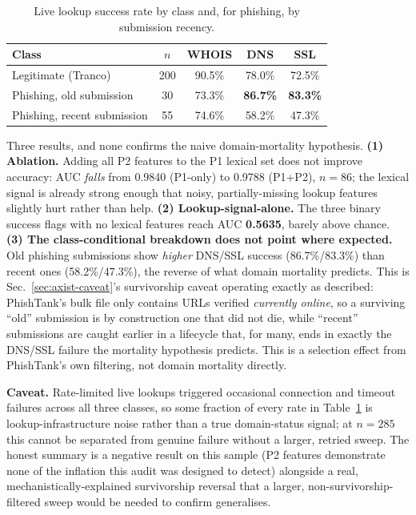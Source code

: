 \documentclass[conference]{IEEEtran}
\begin{document}
\begin{table}[t]
\caption{Live lookup success rate by class and, for phishing, by
submission recency.}
\label{tab:provenance}
\centering\footnotesize
\begin{tabular}{@{}lcccc@{}}
\toprule
\textbf{Class} & \textbf{$n$} & \textbf{WHOIS} & \textbf{DNS} & \textbf{SSL}\\
\midrule
Legitimate (Tranco) & 200 & 90.5\% & 78.0\% & 72.5\%\\
Phishing, old submission & 30 & 73.3\% & \textbf{86.7\%} & \textbf{83.3\%}\\
Phishing, recent submission & 55 & 74.6\% & 58.2\% & 47.3\%\\
\bottomrule
\end{tabular}
\end{table}

Three results, and none confirms the naive domain-mortality hypothesis.
\textbf{(1) Ablation.} Adding all P2 features to the P1 lexical set does not improve accuracy: AUC \emph{falls} from 0.9840 (P1-only) to
0.9788
(P1+P2), $n=86$; the lexical signal is already strong enough that noisy,
partially-missing lookup features slightly hurt rather than help.
\textbf{(2) Lookup-signal-alone.} The three binary success flags with no
lexical features reach AUC \textbf{0.5635}, barely above chance.
\textbf{(3) The class-conditional breakdown does not point where
expected.} Old phishing submissions show \emph{higher} DNS/SSL success
(86.7\%/83.3\%) than recent ones (58.2\%/47.3\%), the reverse of what domain mortality
predicts. This is Sec.~\ref{sec:axist-caveat}'s
survivorship caveat operating exactly as described: PhishTank's bulk file
only contains URLs verified \emph{currently online}, so a surviving
``old'' submission is by construction one that did not die, while
``recent'' submissions are caught earlier in a lifecycle that, for many,
ends in exactly the DNS/SSL failure the mortality hypothesis predicts.
This is a selection effect from PhishTank's own filtering, not domain
mortality directly.

\textbf{Caveat.} Rate-limited live lookups triggered occasional
connection and timeout failures across all three classes, so some
fraction of every rate in Table~\ref{tab:provenance} is
lookup-infrastructure noise rather than a true domain-status signal; at
$n=285$ this cannot be separated from genuine failure without a larger,
retried sweep. The honest summary is a negative result on this sample (P2 features demonstrate none of the
inflation this audit was designed to detect) alongside a real,
mechanistically-explained
survivorship reversal that a larger, non-survivorship-filtered sweep
would be needed to confirm generalises.
\end{document}
